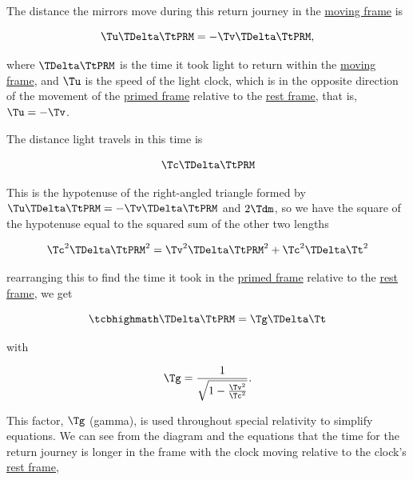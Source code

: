 The distance the mirrors move during this return journey in the \hyperlink{def-Moving-Frame}{moving frame} is

\begin{equation}
	{\Tu }{\TDelta  \TtPRM  } =-{\Tv } {\TDelta  \TtPRM  },
\end{equation}

where ${\TDelta  \TtPRM  }$ is the time it took light to return within the \hyperlink{def-Moving-Frame}{moving frame}, and ${\Tu }$ is the speed of the light clock, which is in the opposite direction of the movement of the \hyperlink{def-Primed-Frame}{primed frame} relative to the \hyperlink{def-proper-frame}{rest frame}, that is, ${\Tu } =-{\Tv }$.

The distance light travels in this time is

\begin{equation}
	{\Tc }{\TDelta  \TtPRM  }
\end{equation}

This is the hypotenuse of the right-angled triangle formed by ${\Tu }{\TDelta  \TtPRM  }=-{\Tv }{\TDelta  \TtPRM  }$ and $2{\Tdm }$, so we have the square of the hypotenuse equal to the squared sum of the other two lengths

\begin{equation}
	\Tc ^2 \TDelta  \TtPRM ^2 = \Tv ^2 \TDelta  \TtPRM ^2 + \Tc ^2 \TDelta \Tt ^2
\end{equation}

rearranging this to find the time it took in the \hyperlink{def-Primed-Frame}{primed frame} relative to the \hyperlink{def-proper-frame}{rest frame}, we get

\begin{equation}
	\label{eq: general time dilation}
	\mhl{
		\TDelta  \TtPRM  = \Tg  \TDelta \Tt
	}
\end{equation}

with

\begin{equation}
	\Tg  = \frac{1}{\sqrt{1-\frac{ \Tv ^2}{ \Tc ^2} } }.
\end{equation}

This factor, ${\Tg }$ (gamma), is used throughout special relativity to simplify equations.
We can see from the diagram and the equations that the time for the return journey is longer in the frame with the clock moving relative to the clock's \hyperlink{def-proper-frame}{rest frame},


